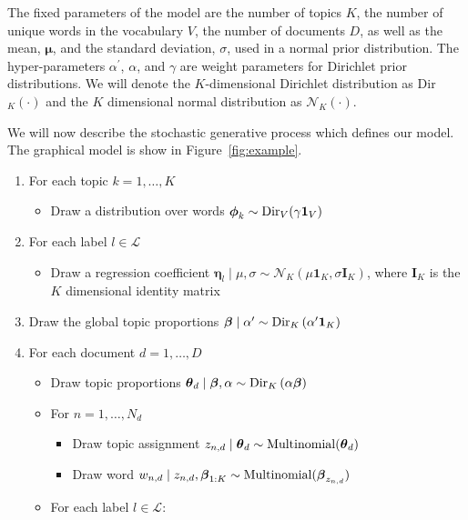 The fixed parameters of the model are the number of topics $K$, the
number of unique words in the vocabulary $V$, the number of documents
$D$, as well as the mean, $\boldsymbol\mu$, and the standard deviation, $\sigma$,
used in a normal prior distribution. The hyper-parameters $\alpha^{\prime}$,
$\alpha$, and $\gamma$ are weight parameters for Dirichlet prior
distributions. We will denote the $K$-dimensional Dirichlet distribution
as Dir$_{K}(\cdot)$ and the $K$ dimensional normal distribution
as $\mathcal{N}_{K}(\cdot)$.

We will now describe the stochastic generative process which defines
our model. The graphical model is show in Figure~\ref{fig:example}.

\begin{enumerate}
\item For each topic $k=1,\ldots,K$

\begin{itemize}
\item Draw a distribution over words $\boldsymbol\phi_{k}\sim{\rm Dir}_{V}(\gamma\mathbf{1}_V)$%
\end{itemize}
\item For each label $l\in\mathcal{L}$

\begin{itemize}
\item Draw a regression coefficient $\boldsymbol\eta_{l}\mid\mu,\sigma\sim\mathcal{N}_{K}(\mu \mathbf{1}_K,\sigma \mathbf{I}_{K})$,
where $\mathbf{I}_{K}$ is the $K$ dimensional identity matrix 
\end{itemize}
\item Draw the global topic proportions $\boldsymbol\beta\mid\alpha'\sim{\rm Dir}_{K}\left(\alpha^{\prime}\mathbf{1}_K\right)$
\item For each document $d=1,\ldots,D$

\begin{itemize}
\item Draw topic proportions $\boldsymbol\theta_d\mid\boldsymbol\beta,\alpha\sim{\rm Dir}_{K}\left(\alpha\boldsymbol\beta\right)$ 
\item For $n=1,\ldots,N_{d}$

\begin{itemize}
\item Draw topic assignment $z_{n,d}\mid\boldsymbol\theta_d\sim{\rm Multinomial}(\boldsymbol\theta_d)$ 
\item Draw word $w_{n,d}\mid z_{n,d},\boldsymbol\beta_{1:K}\sim{\rm Multinomial}(\boldsymbol\beta_{z_{n,d}})$ 
\end{itemize}
\item For each label $l\in\mathcal{L}$: 


\end{itemize}
\end{enumerate}
